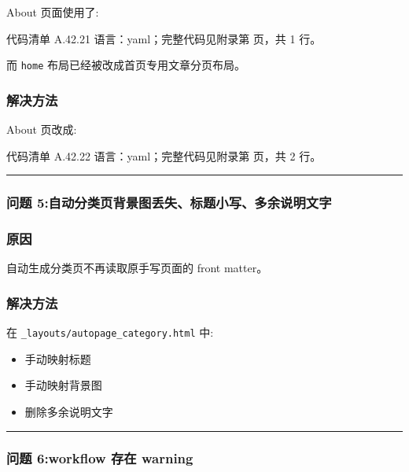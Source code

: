 \documentclass[lang=cn,scheme=chinese,color=blue,device=normal,toc=onecol,math=cm]{elegantbook}
\begin{document}
About 页面使用了:\par


\begin{codeindexbox}{代码清单 A.42.21}
语言：yaml；完整代码见附录第 \pageref{code:42:21} 页，共 1 行。
\end{codeindexbox}


而 \texttt{home} 布局已经被改成首页专用文章分页布局。\par


\subsubsection{解决方法}


About 页改成:\par


\begin{codeindexbox}{代码清单 A.42.22}
语言：yaml；完整代码见附录第 \pageref{code:42:22} 页，共 2 行。
\end{codeindexbox}


\medskip\hrule\medskip


\subsubsection{问题 5:自动分类页背景图丢失、标题小写、多余说明文字}


\subsubsection{原因}


自动生成分类页不再读取原手写页面的 front matter。\par


\subsubsection{解决方法}


在 \texttt{\_\allowbreak{}layouts/\allowbreak{}autopage\_\allowbreak{}category.html} 中:\par


\begin{itemize}
\item 手动映射标题
\item 手动映射背景图
\item 删除多余说明文字
\end{itemize}


\medskip\hrule\medskip


\subsubsection{问题 6:workflow 存在 warning}
\end{document}
